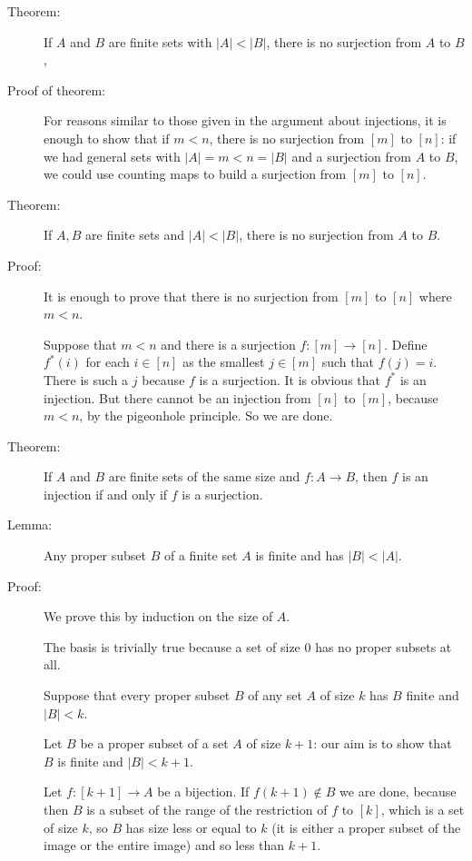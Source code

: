 \documentclass[12pt]{article}
\begin{document}
\begin{description}



\item[Theorem:] If $A$ and $B$ are finite sets with $|A|<|B|$, there is no surjection from $A$ to $B$,

\item[Proof of theorem:]  For reasons similar to those given in the argument about injections, it is enough to show
that if $m<n$, there is no surjection from $[m]$ to $[n]$:  if we had general sets with $|A|=m<n=|B|$ and a surjection from $A$ to $B$, we could use counting maps to build a surjection from $[m]$ to $[n]$.

\item[Theorem:]  If $A,B$ are finite sets and $|A|<|B|$, there is no surjection from $A$ to $B$.

\item[Proof:]  It is enough to prove that there is no surjection from $[m]$ to $[n]$ where $m<n$.

Suppose that $m<n$ and there is a surjection $f:[m] \rightarrow [n]$.  Define $f^*(i)$ for each
$i \in [n]$ as the smallest $j \in [m]$ such that $f(j)=i$.  There is such a $j$ because $f$ is a surjection.
It is obvious that $f^*$ is an injection.  But there cannot be an injection from $[n]$ to $[m]$, because $m<n$, by the pigeonhole principle.  So we are done. 

\item[Theorem:]  If $A$ and $B$ are finite sets of the same size and $f:A \rightarrow B$, then $f$ is an injection if and only if $f$ is a surjection.

\item[Lemma:]  Any proper subset $B$ of a finite set $A$ is finite and has $|B|<|A|$.

\item[Proof:]  We prove this by induction on the size of $A$.

The basis is trivially true because a set of size 0 has no proper subsets at all.

Suppose that every proper subset $B$ of any set $A$ of size $k$  has $B$ finite and $|B|<k$.

Let $B$ be a proper subset of a set $A$ of size $k+1$:  our aim is to show that $B$ is finite and $|B|<k+1$.

Let $f:[k+1]\rightarrow A$ be a bijection.  If $f(k+1) \not\in B$ we are done, because then $B$ is a subset of the range of the restriction of $f$ to $[k]$, which is a set of size $k$, so $B$ has size less or equal to $k$ (it is either a proper subset of the image or the entire image) and so less than $k+1$.


\end{description}
\end{document}
